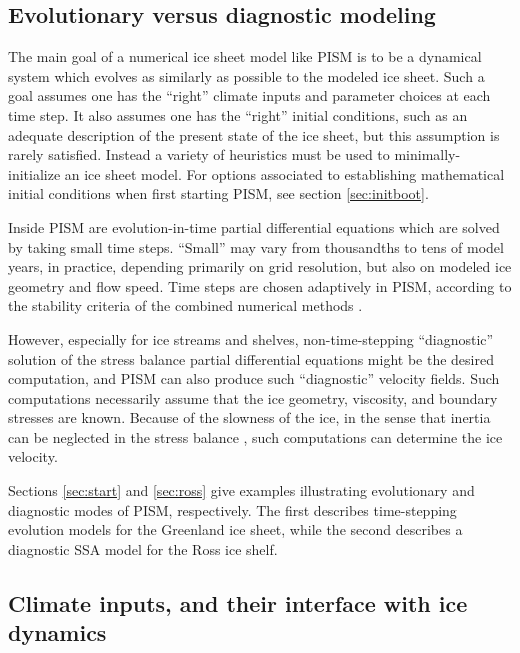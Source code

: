 \subsection{Evolutionary versus diagnostic modeling} \label{subsect:basicmodes}    The main goal of a numerical ice sheet model like PISM is to be a dynamical system which evolves as similarly as possible to the modeled ice sheet.  Such a goal assumes one has the ``right'' climate inputs and parameter choices at each time step.  It also assumes one has the ``right'' initial conditions, such as an adequate description of the present state of the ice sheet, but this assumption is rarely satisfied.  Instead a variety of heuristics must be used to minimally-initialize an ice sheet model.  For options associated to establishing mathematical initial conditions when first starting PISM, see section \ref{sec:initboot}.

Inside PISM are evolution-in-time partial differential equations which are solved by taking small time steps.  ``Small'' may vary from thousandths to tens of model years, in practice, depending primarily on grid resolution, but also on modeled ice geometry and flow speed.  Time steps are chosen adaptively in PISM, according to the stability criteria of the combined numerical methods \cite{BBssasliding,BBL}.

However, especially for ice streams and shelves, non-time-stepping ``diagnostic'' solution of the stress balance partial differential equations might be the desired computation, and PISM can also produce such ``diagnostic'' velocity fields.  Such computations necessarily assume that the ice geometry, viscosity, and boundary stresses are known.  Because of the slowness of the ice, in the sense that inertia can be neglected in the stress balance \cite{Fowler}, such computations can determine the ice velocity.

Sections \ref{sec:start} and \ref{sec:ross} give examples illustrating evolutionary and diagnostic modes of PISM, respectively.  The first describes time-stepping evolution models for the Greenland ice sheet, while the second describes a diagnostic SSA model for the Ross ice shelf.


\subsection{Climate inputs, and their interface with ice dynamics}
\label{sec:climate-inputs}  

